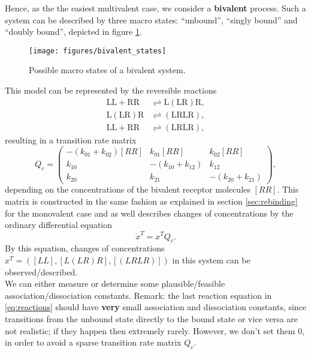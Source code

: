 Hence, as the the easiest multivalent case, we consider a \textbf{bivalent} process.
Such a system can be described by three macro states: ``unbound'', ``singly bound'' and ``doubly bound'', depicted in figure \ref{fig:bivalent_states}. %
\begin{figure}[h] %
	\centering
	\texttt{[image: figures/bivalent\_states]}
	\caption{Possible macro states of a bivalent system.}
	\label{fig:bivalent_states}
\end{figure}
This model can be represented by the reversible reactions
\begin{equation}
\begin{aligned}
\label{eq:reactions}
\mathrm{LL} + \mathrm{RR} & \rightleftharpoons \mathrm{L(LR)R}, \\
\mathrm{L(LR)R} & \rightleftharpoons \mathrm{(LRLR)}, \\
\mathrm{LL} + \mathrm{RR} & \rightleftharpoons \mathrm{(LRLR)},
\end{aligned}
\end{equation}
resulting in a transition rate matrix
\begin{equation*}
Q_c = 
\begin{pmatrix}
	-(k_{01} + k_{02})[RR]	& k_{01}[RR] 		 & k_{02}[RR]  \\
	k_{10}      			& -(k_{10} + k_{12}) & 	k_{12}	\\
	k_{20}					&	k_{21}			 & -(k_{20} + k_{21})
\end{pmatrix},
\end{equation*}
depending on the concentrations of the bivalent receptor molecules $[RR]$.
This matrix is constructed in the same fashion as explained in section \ref{sec:rebinding} for the monovalent case and as well describes changes of concentrations by the ordinary differential equation
\begin{equation*}
\dot{x}^T = x^T Q_c.
\end{equation*}
By this equation, changes of concentrations $x^T = ([LL], [L(LR)R], [(LRLR)])$ in this system can be observed/described.
\\

We can either measure or determine some plausible/feasible association/dissociation constants.
Remark: the last reaction equation in \eqref{eq:reactions} should have \textbf{very} small association and dissociation constants, since transitions from the unbound state directly to the bound state or vice versa are not realistic; if they happen then extremely rarely. However, we don't set them $0$, in order to avoid a sparse transition rate matrix $Q_c$.

